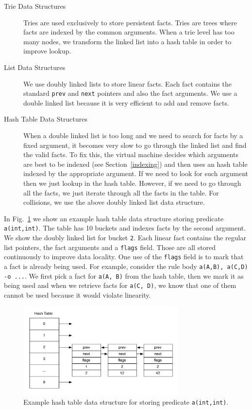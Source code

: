 \begin{description}
   \item[Trie Data Structures]

   Tries are used exclusively to store persistent facts.
   Tries are trees where facts are indexed by the common arguments. When a trie level has too many nodes, we
   transform the linked list into a hash table in order to improve lookup.
      
   \item[List Data Structures]
   
   We use doubly linked lists to store linear facts. Each fact contains the standard \texttt{prev} and \texttt{next} pointers
   and also the fact arguments. We use a double linked list because it is very efficient to add and remove facts.
   
   \item[Hash Table Data Structures]
   
   When a double linked list is too long and we need to search for facts by a fixed argument, it becomes very slow to go through the
   linked list and find the valid facts. To fix this, the virtual machine decides which arguments are best to be indexed
   (see Section~\ref{indexing}) and then
   uses an hash table indexed by the appropriate argument. If we need to look for such argument then we just lookup in the hash table. However,
   if we need to go through all the facts, we just iterate through all the facts in the table. For collisions, we use the above doubly linked list data structure.
\end{description}

In Fig.~\ref{fig:hash_table} we show an example hash table data structure storing predicate \texttt{a(int,int)}. The table
has 10 buckets and indexes facts by the second argument. We show the doubly linked list for bucket \texttt{2}. Each linear fact
contains the regular list pointers, the fact arguments and a \texttt{flags} field. Those are all stored continuously to improve data
locality. One use of the \texttt{flags} field is to mark that a fact is already being used. For example,
consider the rule body \texttt{a(A,B), a(C,D) -o ...}. We first pick a fact for \texttt{a(A, B)} from the hash table, then we mark it as
being used and when we retrieve facts for \texttt{a(C, D)}, we know that one of them cannot be used because it would
violate linearity.

\begin{figure}[h]
   \centering
   \includegraphics[width=0.75\textwidth]{hash_table.pdf}
   \caption{Example hash table data structure for storing predicate \texttt{a(int,int)}.}
   \label{fig:hash_table}
\end{figure}

